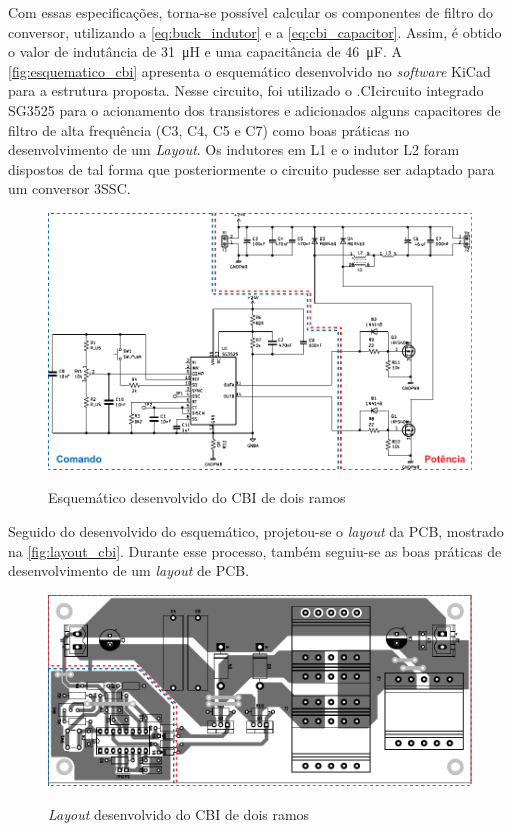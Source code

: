     Com essas especificações, torna-se possível calcular os componentes de filtro do conversor, utilizando a \autoref{eq:buck_indutor} e a \autoref{eq:cbi_capacitor}. Assim, é obtido o valor de indutância de \SI{31}{\micro\henry} e uma capacitância de \SI{46}{\micro\farad}. A \autoref{fig:esquematico_cbi} apresenta o esquemático desenvolvido no \textit{software} KiCad para a estrutura proposta. Nesse circuito, foi utilizado o \abreviatura.{CI}{circuito integrado} SG3525 para o acionamento dos transistores e adicionados alguns capacitores de filtro de alta frequência (C3, C4, C5 e C7) como boas práticas no desenvolvimento de um \textit{Layout}. Os indutores em L1 e o indutor L2 foram dispostos de tal forma que posteriormente o circuito pudesse ser adaptado para um conversor 3SSC.
    
    \begin{figure}[H]
    	\centering
    	\caption{Esquemático desenvolvido do CBI de dois ramos}
    	\includegraphics[scale=1]{pdf/layout/Esquematico_CBI_kicad_3.pdf}
        \label{fig:esquematico_cbi}
    \end{figure}
    
    Seguido do desenvolvido do esquemático, projetou-se o \textit{layout} da PCB, mostrado na \autoref{fig:layout_cbi}. Durante esse processo, também seguiu-se as boas práticas de desenvolvimento de um \textit{layout} de PCB. 
    
    \begin{figure}[H]
    	\centering
    	\caption{\textit{Layout} desenvolvido do CBI de dois ramos}
    	\includegraphics[scale=1]{pdf/layout/layout_CBI4.pdf}
        \label{fig:layout_cbi}
    \end{figure}
    
